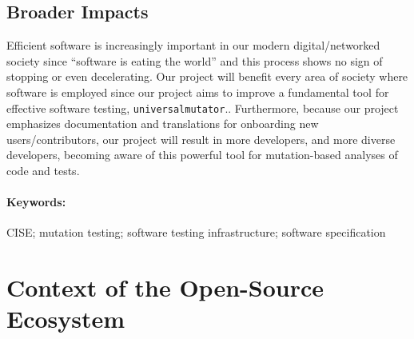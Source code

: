 \documentclass[numbers]{proposalnsf}
\newcommand{\um}{\texttt{universalmutator}}
\begin{document}
\subsection*{Broader Impacts}
\vspace{-2mm}

Efficient software is increasingly important in our modern digital/networked society since ``software is eating the world'' and this process shows no sign of stopping or even decelerating. 
Our project will benefit every area of society where software is employed since our project aims to improve a fundamental tool for effective software testing, \um..
Furthermore, because our project emphasizes documentation and translations for onboarding new users/contributors, our project will result in more developers, and more diverse developers, becoming aware of this powerful tool for mutation-based analyses of code and tests.

\paragraph{Keywords:}
CISE; mutation testing; software testing infrastructure; software specification

\newpage  
\section{Context of the Open-Source Ecosystem}%
\end{document}
